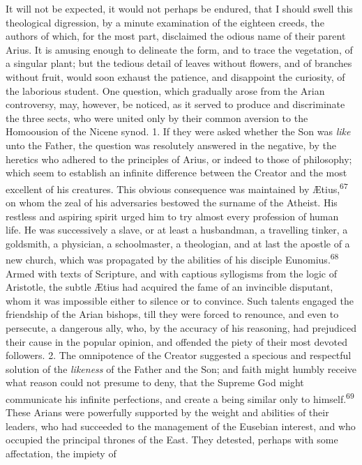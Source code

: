 It will not be expected, it would not perhaps be endured, that I
should swell this theological digression, by a minute examination
of the eighteen creeds, the authors of which, for the most part,
disclaimed the odious name of their parent Arius. It is amusing
enough to delineate the form, and to trace the vegetation, of a
singular plant; but the tedious detail of leaves without flowers,
and of branches without fruit, would soon exhaust the patience,
and disappoint the curiosity, of the laborious student. One
question, which gradually arose from the Arian controversy, may,
however, be noticed, as it served to produce and discriminate the
three sects, who were united only by their common aversion to the
Homoousion of the Nicene synod. 1. If they were asked whether the
Son was \textit{like} unto the Father, the question was resolutely
answered in the negative, by the heretics who adhered to the
principles of Arius, or indeed to those of philosophy; which seem
to establish an infinite difference between the Creator and the
most excellent of his creatures. This obvious consequence was
maintained by Ætius,\textsuperscript{67} on whom the zeal of his adversaries
bestowed the surname of the Atheist. His restless and aspiring
spirit urged him to try almost every profession of human life. He
was successively a slave, or at least a husbandman, a travelling
tinker, a goldsmith, a physician, a schoolmaster, a theologian,
and at last the apostle of a new church, which was propagated by
the abilities of his disciple Eunomius.\textsuperscript{68} Armed with texts of
Scripture, and with captious syllogisms from the logic of
Aristotle, the subtle Ætius had acquired the fame of an
invincible disputant, whom it was impossible either to silence or
to convince. Such talents engaged the friendship of the Arian
bishops, till they were forced to renounce, and even to
persecute, a dangerous ally, who, by the accuracy of his
reasoning, had prejudiced their cause in the popular opinion, and
offended the piety of their most devoted followers. 2. The
omnipotence of the Creator suggested a specious and respectful
solution of the \textit{likeness} of the Father and the Son; and faith
might humbly receive what reason could not presume to deny, that
the Supreme God might communicate his infinite perfections, and
create a being similar only to himself.\textsuperscript{69} These Arians were
powerfully supported by the weight and abilities of their
leaders, who had succeeded to the management of the Eusebian
interest, and who occupied the principal thrones of the East.
They detested, perhaps with some affectation, the impiety of
